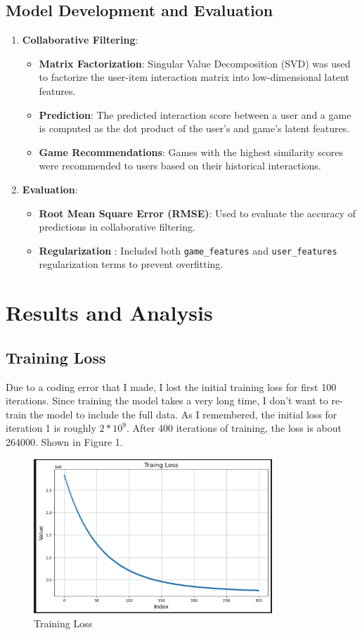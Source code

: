 \documentclass[12pt]{article}
\begin{document}
\subsection{Model Development and Evaluation}
\begin{enumerate}
	\item \textbf{Collaborative Filtering}:
	\begin{itemize}
		\item \textbf{Matrix Factorization}: Singular Value Decomposition (SVD) was used to factorize the user-item interaction matrix into low-dimensional latent features. 
		\item \textbf{Prediction}: The predicted interaction score between a user and a game is computed as the dot product of the user's and game's latent features.
		\item \textbf{Game Recommendations}: Games with the highest similarity scores were recommended to users based on their historical interactions.
	\end{itemize}
	
	\item \textbf{Evaluation}:
	\begin{itemize}
		\item \textbf{Root Mean Square Error (RMSE)}: Used to evaluate the accuracy of predictions in collaborative filtering.
		\item \textbf{Regularization} : Included both \texttt{game\_features} and \texttt{user\_features} regularization terms to prevent overfitting. 
	\end{itemize}
\end{enumerate}

\section{Results and Analysis}
\subsection{Training Loss}
Due to a coding error that I made, I lost the initial training loss for first 100 iterations. Since training the model takes a very long time, I don't want to re-train the model to include the full data. As I remembered, the initial loss for iteration 1 is roughly $2*10^9$. After 400 iterations of training, the loss is about 264000. Shown in Figure 1.
\begin{figure}[h]
	\centering
	\includegraphics[width=0.8\textwidth]{loss.png} %
	\caption{Training Loss}
	\label{fig:Training Loss}
\end{figure}
\end{document}
